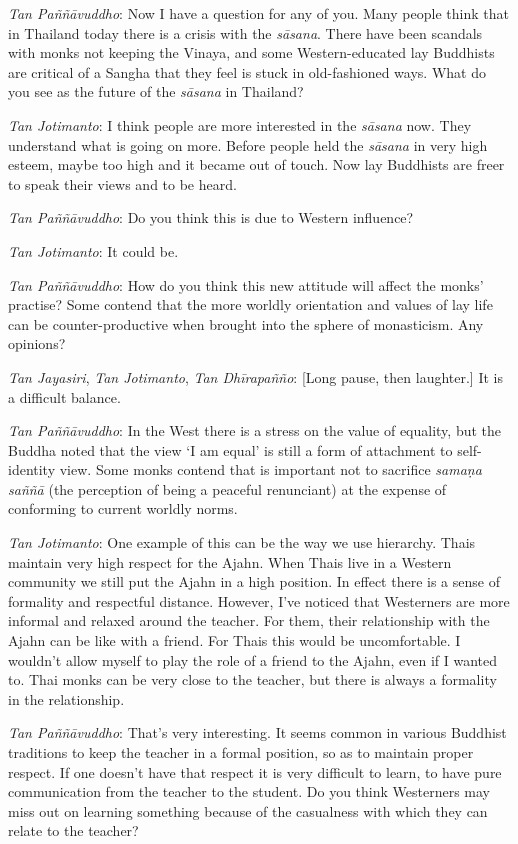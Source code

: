 \emph{Tan Paññāvuddho}: Now I have a question for any of you. Many
people think that in Thailand today there is a crisis with the
\emph{sāsana}. There have been scandals with monks not keeping the
Vinaya, and some Western-educated lay Buddhists are critical of a Sangha
that they feel is stuck in old-fashioned ways. What do you see as the
future of the \emph{sāsana} in Thailand? 

\emph{Tan Jotimanto}: I think people are more interested in the
\emph{sāsana} now. They understand what is going on more. Before people
held the \emph{sāsana} in very high esteem, maybe too high and it became
out of touch. Now lay Buddhists are freer to speak their views and to be
heard. 

\emph{Tan Paññāvuddho}: Do you think this is due to Western influence? 

\emph{Tan Jotimanto}: It could be. 

\emph{Tan Paññāvuddho}: How do you think this new attitude will affect
the monks' practise? Some contend that the more worldly orientation and
values of lay life can be counter-productive when brought into the
sphere of monasticism. Any opinions? 

\emph{Tan Jayasiri}, \emph{Tan Jotimanto}, \emph{Tan Dhīrapañño}:
[Long pause, then laughter.] It is a difficult balance.

\emph{Tan Paññāvuddho}: In the West there is a stress on the value of
equality, but the Buddha noted that the view `I am equal' is still a
form of attachment to self-identity view. Some monks contend that is
important not to sacrifice \emph{samaṇa saññā} (the perception of being
a peaceful renunciant) at the expense of conforming to current worldly
norms. 

\emph{Tan Jotimanto}: One example of this can be the way we use
hierarchy. Thais maintain very high respect for the Ajahn. When Thais
live in a Western community we still put the Ajahn in a high position. 
In effect there is a sense of formality and respectful distance. 
However, I've noticed that Westerners are more informal and relaxed
around the teacher. For them, their relationship with the Ajahn can be
like with a friend. For Thais this would be uncomfortable. I wouldn't
allow myself to play the role of a friend to the Ajahn, even if I wanted
to. Thai monks can be very close to the teacher, but there is always a
formality in the relationship. 

\emph{Tan Paññāvuddho}: That's very interesting. It seems common in
various Buddhist traditions to keep the teacher in a formal position, so
as to maintain proper respect. If one doesn't have that respect it is
very difficult to learn, to have pure communication from the teacher to
the student. Do you think Westerners may miss out on learning something
because of the casualness with which they can relate to the teacher? 

